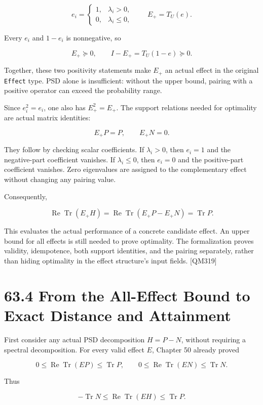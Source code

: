 \documentclass[
  11pt,
  oneside]{book}
\begin{document}
\[
e_i=\begin{cases}
1,&\lambda_i>0,\\
0,&\lambda_i\le0,
\end{cases}
\qquad E_+=T_U(e).
\]

Every \(e_i\) and \(1-e_i\) is nonnegative, so

\[
E_+\succeq0,
\qquad
I-E_+=T_U(1-e)\succeq0.
\]

Together, these two positivity statements make \(E_+\) an actual effect
in the original \texttt{Effect} type. PSD alone is insufficient: without
the upper bound, pairing with a positive operator can exceed the
probability range.

Since \(e_i^2=e_i\), one also has \(E_+^2=E_+\). The support relations
needed for optimality are actual matrix identities:

\[
E_+P=P,
\qquad
E_+N=0.
\]

They follow by checking scalar coefficients. If \(\lambda_i>0\), then
\(e_i=1\) and the negative-part coefficient vanishes. If
\(\lambda_i\le0\), then \(e_i=0\) and the positive-part coefficient
vanishes. Zero eigenvalues are assigned to the complementary effect
without changing any pairing value.

Consequently,

\[
\operatorname{Re}\operatorname{Tr}(E_+H)
=\operatorname{Re}\operatorname{Tr}(E_+P-E_+N)
=\operatorname{Tr}P.
\]

This evaluates the actual performance of a concrete candidate effect. An
upper bound for all effects is still needed to prove optimality. The
formalization proves validity, idempotence, both support identities, and
the pairing separately, rather than hiding optimality in the effect
structure's input fields. {[}QM319{]}

\section{63.4 From the All-Effect Bound to Exact Distance and
Attainment}

First consider any actual PSD decomposition \(H=P-N\), without requiring
a spectral decomposition. For every valid effect \(E\), Chapter 50
already proved

\[
0\le\operatorname{Re}\operatorname{Tr}(EP)\le\operatorname{Tr}P,
\qquad
0\le\operatorname{Re}\operatorname{Tr}(EN)\le\operatorname{Tr}N.
\]

Thus

\[
-\operatorname{Tr}N
\le\operatorname{Re}\operatorname{Tr}(EH)
\le\operatorname{Tr}P.
\]
\end{document}
